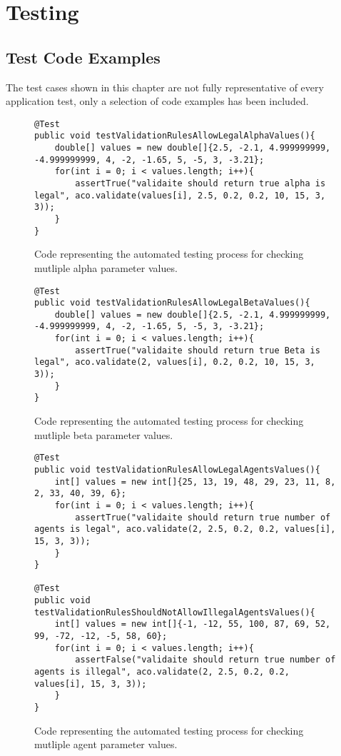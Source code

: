 \chapter{Testing}
\renewcommand{\thechapter}{\Alph{chapter}}

\section{Test Code Examples}

The test cases shown in this chapter are not fully representative of every application test, only a selection of code examples has been included.

\begin{figure}[H]
\begin{lstlisting}
@Test
public void testValidationRulesAllowLegalAlphaValues(){
	double[] values = new double[]{2.5, -2.1, 4.999999999, -4.999999999, 4, -2, -1.65, 5, -5, 3, -3.21};
	for(int i = 0; i < values.length; i++){
		assertTrue("validaite should return true alpha is legal", aco.validate(values[i], 2.5, 0.2, 0.2, 10, 15, 3, 3));
	}
}
\end{lstlisting}
\caption[Alpha Parameter Test Code]{Code representing the automated testing process for checking mutliple alpha parameter values.}
\label{testAlpha}
\end{figure}

\begin{figure}[H]
\begin{lstlisting}
@Test
public void testValidationRulesAllowLegalBetaValues(){
	double[] values = new double[]{2.5, -2.1, 4.999999999, -4.999999999, 4, -2, -1.65, 5, -5, 3, -3.21};
	for(int i = 0; i < values.length; i++){
		assertTrue("validaite should return true Beta is legal", aco.validate(2, values[i], 0.2, 0.2, 10, 15, 3, 3));
	}
}
\end{lstlisting}
\caption[Beta Parameter Test Code]{Code representing the automated testing process for checking mutliple beta parameter values.}
\label{testBeta}
\end{figure}

\begin{figure}[H]
\begin{lstlisting}
@Test
public void testValidationRulesAllowLegalAgentsValues(){
	int[] values = new int[]{25, 13, 19, 48, 29, 23, 11, 8, 2, 33, 40, 39, 6};
	for(int i = 0; i < values.length; i++){
		assertTrue("validaite should return true number of agents is legal", aco.validate(2, 2.5, 0.2, 0.2, values[i], 15, 3, 3));
	}
}

@Test
public void testValidationRulesShouldNotAllowIllegalAgentsValues(){
	int[] values = new int[]{-1, -12, 55, 100, 87, 69, 52, 99, -72, -12, -5, 58, 60};
	for(int i = 0; i < values.length; i++){
		assertFalse("validaite should return true number of agents is illegal", aco.validate(2, 2.5, 0.2, 0.2, values[i], 15, 3, 3));
	}
}
\end{lstlisting}
\caption[Agent Parameter Test Code]{Code representing the automated testing process for checking mutliple agent parameter values.}
\label{testAgent}
\end{figure}

